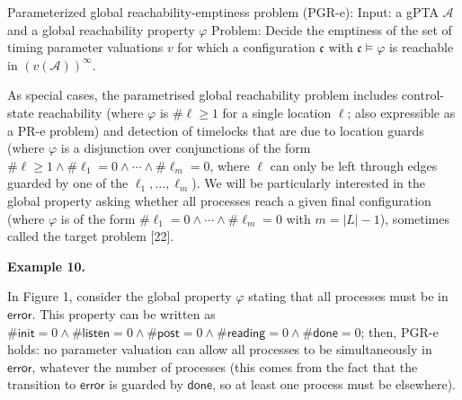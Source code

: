 \documentclass[10pt,a4paper]{article}
\begin{document}
 
 
Parameterized global reachability-emptiness problem (PGR-e): Input: a gPTA $\mathcal{A}$ and a global reachability property $\varphi$ Problem: Decide the emptiness of the set of timing parameter valuations $v$ for which a configuration $\mathfrak{c}$ with $\mathfrak{c}\models\varphi$ is reachable in ${(v(\mathcal{A}))}^{\infty}$.\par
 
 
 
As special cases, the parametrised global reachability problem includes control-state reachability (where $\varphi$ is $\#\mathrm{\ell}\geq 1$ for a single location $\mathrm{\ell}$; also expressible as a PR-e problem) and detection of timelocks that are due to location guards (where $\varphi$ is a disjunction over conjunctions of the form $\#\mathrm{\ell}\geq 1\land\#\mathrm{\ell}_{1}=0\land\cdots\land\#\mathrm{\ell}_{m}=0$, where $\mathrm{\ell}$ can only be left through edges guarded by one of the $\mathrm{\ell}_{1},\ldots,\mathrm{\ell}_{m}$). We will be particularly interested in the global property asking whether all processes reach a given final configuration (where $\varphi$ is of the form $\#\mathrm{\ell}_{1}=0\land\cdots\land\#\mathrm{\ell}_{m}=0$ with $m=|L|-1$), sometimes called the target problem [22].\par
 
 
 
\par\medskip\noindent\textbf{Example 10.}\par
 
 
In Figure 1, consider the global property $\varphi$ stating that all processes must be in $\mathsf{error}$. This property can be written as $\#\mathsf{init}=0\land\#\mathsf{listen}=0\land\#\mathsf{post}=0\land\#\mathsf{reading}=0\land\#\mathsf{done}=0$; then, PGR-e holds: no parameter valuation can allow all processes to be simultaneously in $\mathsf{error}$, whatever the number of processes (this comes from the fact that the transition to $\mathsf{error}$ is guarded by $\mathsf{done}$, so at least one process must be elsewhere).\par
 
\end{document}
